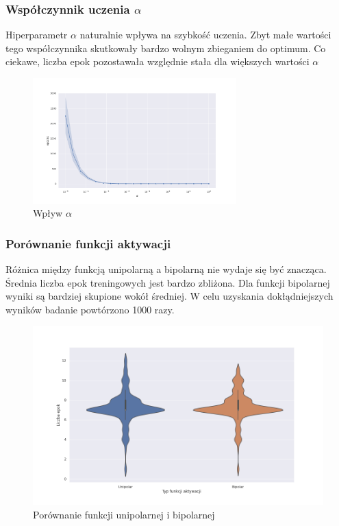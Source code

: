 \documentclass{article}
\begin{document}
\subsubsection{Współczynnik uczenia $\alpha$}
Hiperparametr $\alpha$ naturalnie wpływa na szybkość uczenia.
Zbyt małe wartości tego współczynnika skutkowały bardzo wolnym zbieganiem do optimum.
Co ciekawe, liczba epok pozostawała względnie stała dla większych wartości $\alpha$

\begin{figure}[h]
  \caption{Wpływ $\alpha$ }
  \centering
    \includegraphics[width=0.7\textwidth]{images/04_per_lr.png}
\end{figure}

\subsubsection{Porównanie funkcji aktywacji}
Różnica między funkcją unipolarną a bipolarną nie wydaje się być znacząca.
Średnia liczba epok treningowych jest bardzo zbliżona.
Dla funkcji bipolarnej wyniki są bardziej skupione wokół średniej.
W celu uzyskania dokłądniejszych wyników badanie powtórzono 1000 razy.

\begin{figure}[h]
  \caption{Porównanie funkcji unipolarnej i bipolarnej}
  \centering
    \includegraphics[width=1\textwidth]{images/05_per_uni_bi.png}
\end{figure}
\end{document}
